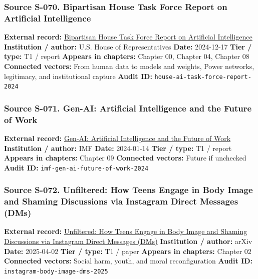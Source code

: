 \documentclass[
  american,
  11pt,
  letterpaper,
]{article}
\begin{document}
\subsubsection{Source S-070. Bipartisan House Task Force Report on
Artificial
Intelligence}\label{source-s-070-bipartisan-house-task-force-report-on-artificial-intelligence}

\textbf{External record:}
\href{https://www.speaker.gov/wp-content/uploads/2024/12/AI-Task-Force-Report-FINAL.pdf}{Bipartisan
House Task Force Report on Artificial Intelligence} \textbf{Institution
/ author:} U.S. House of Representatives \textbf{Date:} 2024-12-17
\textbf{Tier / type:} T1 / report \textbf{Appears in chapters:} Chapter
00, Chapter 04, Chapter 08 \textbf{Connected vectors:} From human data
to models and weights, Power networks, legitimacy, and institutional
capture \textbf{Audit ID:} \texttt{house-ai-task-force-report-2024}

\subsubsection{Source S-071. Gen-AI: Artificial Intelligence and the
Future of
Work}\label{source-s-071-gen-ai-artificial-intelligence-and-the-future-of-work}

\textbf{External record:}
\href{https://www.imf.org/en/publications/staff-discussion-notes/issues/2024/01/14/gen-ai-artificial-intelligence-and-the-future-of-work-542379}{Gen-AI:
Artificial Intelligence and the Future of Work} \textbf{Institution /
author:} IMF \textbf{Date:} 2024-01-14 \textbf{Tier / type:} T1 / report
\textbf{Appears in chapters:} Chapter 09 \textbf{Connected vectors:}
Future if unchecked \textbf{Audit ID:}
\texttt{imf-gen-ai-future-of-work-2024}

\subsubsection{Source S-072. Unfiltered: How Teens Engage in Body Image
and Shaming Discussions via Instagram Direct Messages
(DMs)}\label{source-s-072-unfiltered-how-teens-engage-in-body-image-and-shaming-discussions-via-instagram-direct-messages-dms}

\textbf{External record:}
\href{https://arxiv.org/abs/2504.02176}{Unfiltered: How Teens Engage in
Body Image and Shaming Discussions via Instagram Direct Messages (DMs)}
\textbf{Institution / author:} arXiv \textbf{Date:} 2025-04-02
\textbf{Tier / type:} T1 / paper \textbf{Appears in chapters:} Chapter
02 \textbf{Connected vectors:} Social harm, youth, and moral
reconfiguration \textbf{Audit ID:}
\texttt{instagram-body-image-dms-2025}
\end{document}
